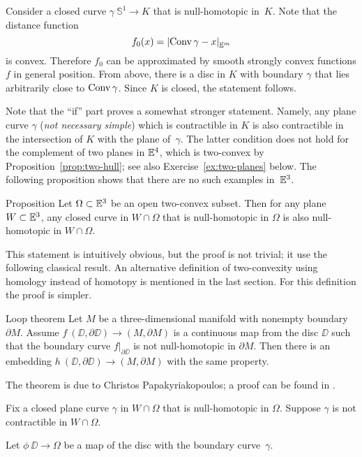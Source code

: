 Consider a closed curve $\gamma\:\mathbb{S}^1\to K$ that is null-homotopic in~$K$.
Note that the distance function \[f_0(x)\z=\dist{\Conv\gamma}{x}{\EE^m}\] 
is convex.
Therefore $f_0$ can be approximated by smooth strongly convex functions $f$ in general position.
From above, there is a disc in $K$ with boundary $\gamma$
that lies arbitrarily close to $\mathop{\rm Conv}\nolimits\gamma$.
Since $K$ is closed, the statement follows.
\qeds

Note that the ``if'' part proves a somewhat stronger statement.
Namely,  any plane curve $\gamma$ (\emph{not necessary simple}) which is  contractible in $K$ is also contractible in the intersection of $K$ with the plane of~$\gamma$.
The latter condition does not hold for the complement 
of two planes in $\mathbb{E}^4$, which is two-convex by Proposition~\ref{prop:two-hull};
see also Exercise~\ref{ex:two-planes} below.
The following proposition shows that there are no such examples in~$\mathbb{E}^3$.

\begin{thm}{Proposition}\label{prop:3d-strong-2-convexity}
Let $\Omega\subset\mathbb{E}^3$ be an open two-convex subset.
Then for any plane $W\subset\mathbb{E}^3$, 
any closed curve in $W\cap \Omega$ 
that is null-homotopic in $\Omega$ is also null-homotopic in $W\cap \Omega$.
\end{thm}

This statement is intuitively obvious, but the proof is not trivial;
it use the following classical result.
An alternative definition of two-convexity using homology instead of homotopy is mentioned in the last section.
For this definition the proof is simpler.

\begin{thm}{Loop theorem}
Let $M$ be a three-dimensional manifold with nonempty boundary $\partial M$.
Assume 
$f\: (\DD,\partial \DD)\to (M,\partial M)$
is a continuous map from the disc $\DD$ such that the boundary curve $f|_{\partial \DD}$ is not null-homotopic in $\partial M$.  Then there is an embedding 
$h\: (\DD,\partial \DD)\to (M,\partial M)$ 
with the same property.
\end{thm}

The theorem is due to Christos Papakyriakopoulos; a proof can be found in \cite{hatcher}. 

Fix a closed plane curve $\gamma$ in $W\cap \Omega$ that  is null-homotopic in $\Omega$. Suppose $\gamma$ is not contractible in  $W\cap \Omega$.

Let $\phi\: \DD\to\Omega$ be a map of the disc with the boundary curve~$\gamma$.

